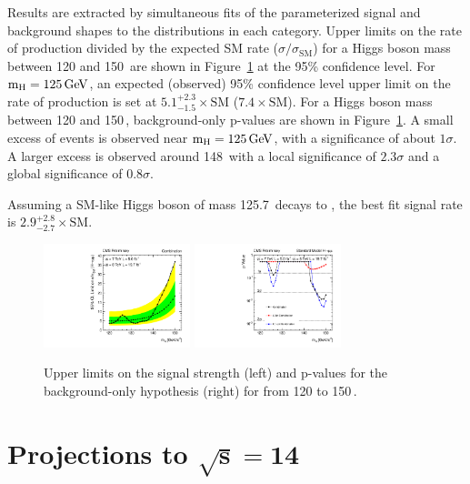 \documentclass[10pt]{article}
\begin{document}
Results are extracted by simultaneous fits of the parameterized signal and background shapes
to the \Mmumu{} distributions in each category.  Upper limits
on the rate of \hmm{} production divided by the expected SM \hmm{} rate ($\sigma/\sigma_\mathrm{SM}$) 
for a Higgs boson mass between 120 and 150\,\GeVcc{} are shown in Figure~\ref{fig:results} at 
the 95\% confidence level.  
For $\mathrm{m_H}{}=125\,\mathrm{Ge\kern -0.1em V}{}{}$, an expected (observed) 95\% confidence level upper limit
on the rate of \hmm{} production is set at 
$5.1^{+2.3}_{-1.5}\times\mathrm{SM}$ ($7.4\times\mathrm{SM}$).
For a Higgs boson mass between 120 and 150\,\GeVcc{}, background-only p-values are shown
in Figure~\ref{fig:results}.  A small excess of events is observed near $\mathrm{m_H}{}=125\,\mathrm{Ge\kern -0.1em V}{}{}$, with
a significance of about $1\sigma$.  A larger excess is observed around 148\,\GeVcc{}
with a local significance of $2.3\sigma$ and a global significance
of $0.8\sigma$.

Assuming a SM-like Higgs boson of mass 125.7\,\GeVcc{} decays to \mm{},
the best fit signal rate is $2.9^{+2.8}_{-2.7}\times\mathrm{SM}$.

\begin{figure}[htb]
\centering
\includegraphics[width=0.38\textwidth]{plotsPublic/limits_annalysisA/pdf/CombSplitAll_7P8TeV.pdf}
\includegraphics[width=0.38\textwidth]{plotsPublic/pValues_analysisA/pdf/pValues_Final7P8TeV.pdf}
\caption{ Upper limits on the signal strength (left) and p-values for the 
            background-only hypothesis (right) for \mh{} from 120 to 150\,\GeVcc{}.}
\label{fig:results}
\end{figure}

\section{Projections to $\mathbf{\sqrt{s}=14}$\,\TeV{}}
\end{document}
